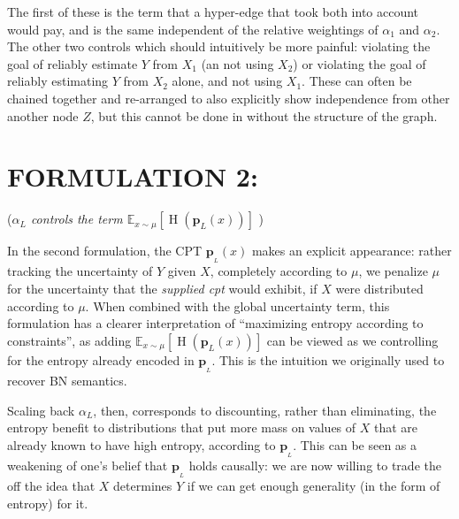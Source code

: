 \documentclass{article}
\renewcommand{\H}{\mathop{\mathrm H}}
\newcommand{\bp}[1][L]{\mathbf{p}_{\!_#1\!}}
\begin{document}
The first of these is the term that a hyper-edge that took both into account would pay, and is the same independent of the relative weightings of $\alpha_1 $ and $\alpha_2$. The other two controls which should intuitively be more painful: violating the goal of reliably estimate $Y$ from $X_1$ (an not using $X_2$) or violating the goal of reliably estimating $Y$ from $X_2$ alone, and not using $X_1$. 
These can often be chained together and re-arranged to also explicitly show independence from other another node $Z$, but this cannot be done in without the structure of the graph.







\section*{FORMULATION 2:}%
\vspace{-1em}
\hspace{1in}(\textit{$\alpha_L$ controls the term $\mathbb E_{x \sim \mu} [ \H (\mathbf p_L(x)) ]$ })
\vspace{1em}

In the second formulation, the CPT $\bp(x)$ makes an explicit appearance: rather tracking the uncertainty of $Y$ given $X$, completely according to $\mu$, we penalize $\mu$ for the uncertainty that the \emph{supplied cpt} would exhibit, if $X$ were distributed according to $\mu$. When combined with the global uncertainty term, this formulation has a clearer interpretation of ``maximizing entropy according to constraints'', as adding $\mathbb E_{x \sim \mu} [ \H (\mathbf p_L(x)) ]$ can be viewed as we controlling for the entropy already encoded in $\bp$. This is the intuition we originally used to recover BN semantics.

Scaling back $\alpha_L$, then, corresponds to discounting, rather than eliminating, the entropy benefit to distributions that put more mass on values of $X$ that are already known to have high entropy, according to $\bp$. 
This can be seen as a weakening of one's belief that $\bp$ holds causally: we are now willing to trade the off the idea that $X$ determines $Y$ if we can get enough generality (in the form of entropy) for it. 
\end{document}

